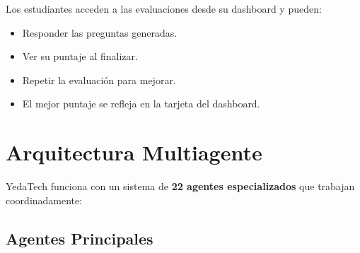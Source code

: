 \documentclass[12pt, a4paper, oneside]{book}
\begin{document}
Los estudiantes acceden a las evaluaciones desde su dashboard y pueden:
\begin{itemize}
    \item Responder las preguntas generadas.
    \item Ver su puntaje al finalizar.
    \item Repetir la evaluación para mejorar.
    \item El mejor puntaje se refleja en la tarjeta del dashboard.
\end{itemize}


\chapter{Arquitectura Multiagente}

YedaTech funciona con un sistema de \textbf{22 agentes especializados} que trabajan coordinadamente:

\section{Agentes Principales}
\end{document}
